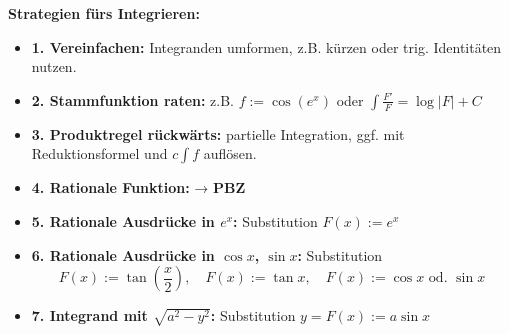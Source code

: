 \textbf{Strategien fürs Integrieren:}
\begin{itemize}
  \item \textbf{1. Vereinfachen:} Integranden umformen, z.B. kürzen oder trig. Identitäten nutzen.
  
  \item \textbf{2. Stammfunktion raten:} z.B. $f := \cos(e^x)$ \quad oder \quad $\int \frac{F'}{F} = \log|F| + C$
  
  \item \textbf{3. Produktregel rückwärts:} partielle Integration, ggf. mit Reduktionsformel und $c \int f$ auflösen.
  
  \item \textbf{4. Rationale Funktion:} → \textbf{PBZ}
  
  \item \textbf{5. Rationale Ausdrücke in $e^x$:} Substitution $F(x) := e^x$
  
  \item \textbf{6. Rationale Ausdrücke in $\cos x$, $\sin x$:} Substitution 
  \[
    F(x) := \tan\left(\frac{x}{2}\right), \quad F(x) := \tan x, \quad F(x) := \cos x \text{ od. } \sin x
  \]
  
  \item \textbf{7. Integrand mit $\sqrt{a^2 - y^2}$:} Substitution $y = F(x) := a \sin x$
\end{itemize}
